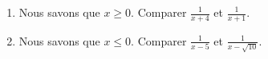 
\begin{exercice}\label{exosmath-0265}

    \begin{enumerate}
        \item
            Nous savons que \( x\geq 0\). Comparer \( \frac{1}{ x+4 }\) et \( \frac{1}{ x+1 }\).
        \item
            Nous savons que \( x\leq 0\). Comparer \( \frac{1}{ x-5 }\) et \( \frac{1}{ x-\sqrt{10} }\).
    \end{enumerate}

\end{exercice}
